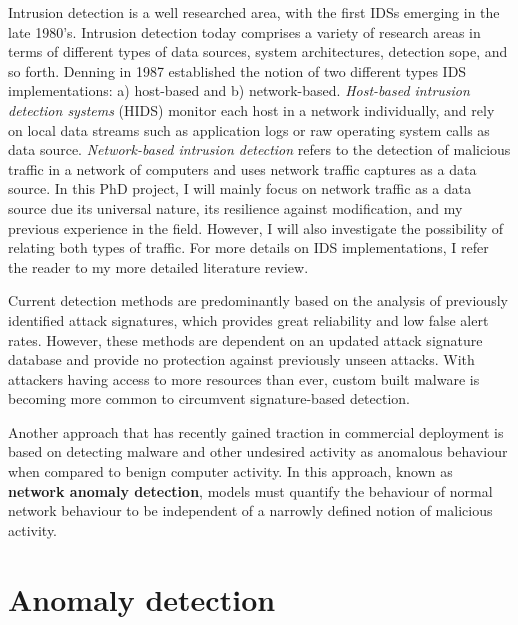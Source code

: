 \documentclass[a4paper,12pt,twoside]{report}
\begin{document}
Intrusion detection is a well researched area, with the first IDSs emerging in the late 1980's. Intrusion detection today comprises a variety of research areas in terms of different types of data sources, system architectures, detection sope, and so forth. Denning \cite{denning1987intrusion} in 1987 established the notion of two different types IDS implementations: a) host-based and b) network-based. 
\textit{Host-based intrusion detection systems} (HIDS) monitor each host in a network individually, and rely on local data streams such as application logs or raw operating system calls as  data source. \textit{Network-based intrusion detection} refers to the detection of malicious traffic in a network of computers and uses network traffic captures as a data source. In this PhD project, I will mainly focus on network traffic as a data source due its universal nature, its resilience against modification, and my previous experience in the field. However, I will also investigate the possibility of relating both types of traffic. For more details on IDS implementations, I refer the reader to my more detailed literature review. 


Current detection methods are predominantly based on the analysis of previously identified attack signatures, which provides great reliability and low false alert rates. However, these methods are dependent on an updated attack signature database and provide no protection against previously unseen attacks. With attackers having access to more resources than ever, custom built malware is becoming more common to circumvent signature-based detection. 

Another approach that has recently gained traction in commercial deployment is based on detecting malware and other undesired activity as anomalous behaviour when compared to benign computer activity. In this approach, known as \textbf{network anomaly detection}, models must quantify the behaviour of normal network behaviour to be independent of a narrowly defined notion of malicious activity.



\section{Anomaly detection}
\end{document}
